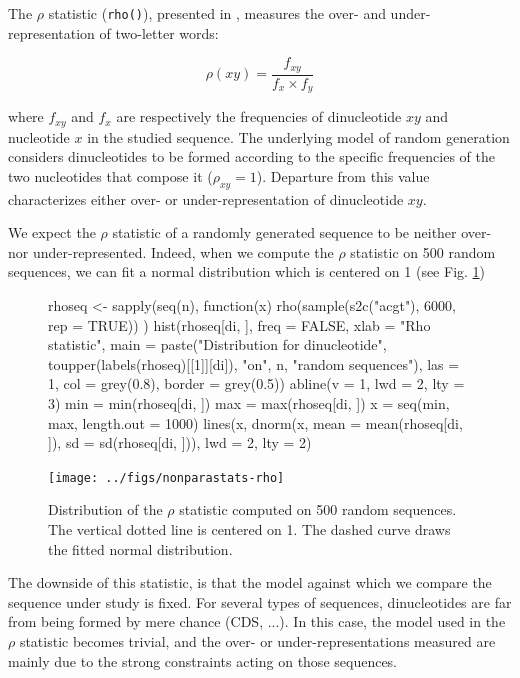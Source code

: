 \documentclass{article}
\begin{document}
The $\rho$ statistic (\texttt{rho()}), presented in \cite{Karlin},
measures the over- and under-representation of two-letter words:

$$\rho(xy) = \frac{f_{xy}}{f_{x}\times f_{y}}$$

where $f_{xy}$ and $f_{x}$ are respectively the frequencies of
dinucleotide $xy$ and nucleotide $x$ in the studied sequence. The
underlying model of random generation considers dinucleotides to be
formed according to the specific frequencies of the two nucleotides
that compose it ($\rho_{xy} = 1$). Departure from this value
characterizes either over- or under-representation of dinucleotide
$xy$.


We expect the $\rho$ statistic of a randomly generated sequence to be
neither over- nor under-represented. Indeed, when we compute the
$\rho$ statistic on 500 random
sequences, we can fit a normal distribution which is centered on 1
(see Fig. \ref{rho})

\begin{figure}[H]
  \begin{center}
\begin{Schunk}
\begin{Sinput}
 rhoseq <- sapply(seq(n), function(x) {
     rho(sample(s2c("acgt"), 6000, rep = TRUE))
 })
 hist(rhoseq[di, ], freq = FALSE, xlab = "Rho statistic", main = paste("Distribution for dinucleotide", 
     toupper(labels(rhoseq)[[1]][di]), "on", n, "random sequences"), 
     las = 1, col = grey(0.8), border = grey(0.5))
 abline(v = 1, lwd = 2, lty = 3)
 min = min(rhoseq[di, ])
 max = max(rhoseq[di, ])
 x = seq(min, max, length.out = 1000)
 lines(x, dnorm(x, mean = mean(rhoseq[di, ]), sd = sd(rhoseq[di, 
     ])), lwd = 2, lty = 2)
\end{Sinput}
\end{Schunk}
\texttt{[image: ../figs/nonparastats-rho]}
\end{center}
   \caption{Distribution of the $\rho$ statistic computed on
     500 random sequences. The vertical
     dotted line is centered on 1. The dashed curve draws the fitted normal
     distribution.}
   \label{rho}
   \end{figure}

The downside of this statistic, is that the model against which we
compare the sequence under study is fixed. For several types of
sequences, dinucleotides are far from being formed by mere chance
(CDS, ...). In this case, the model used in the $\rho$ statistic
becomes trivial, and the over- or under-representations measured are
mainly due to the strong constraints acting on those sequences.
\end{document}
